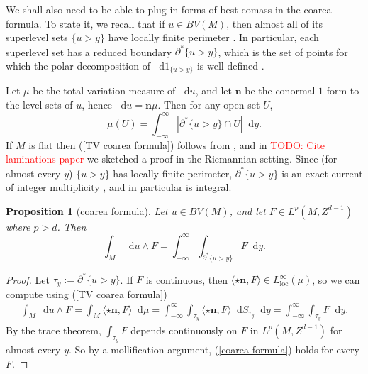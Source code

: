 \documentclass[reqno,11pt]{amsart}
\newcommand*\dif{\mathop{}\!\mathrm{d}}
\newcommand{\normal}{\mathbf n}
\newcommand{\loc}{\mathrm{loc}}
\newtheorem{proposition}[theorem]{Proposition}
\theoremstyle{definition}
\numberwithin{equation}{section}
\newcommand\todo[1]{\textcolor{red}{TODO: #1}}
\begin{document}
We shall also need to be able to plug in forms of best comass in the coarea formula.
To state it, we recall that if $u \in BV(M)$, then almost all of its superlevel sets $\{u > y\}$ have locally finite perimeter \cite[Theorem 1.23]{Giusti77}.
In particular, each superlevel set has a reduced boundary $\partial^* \{u > y\}$, which is the set of points for which the polar decomposition of $\dif 1_{\{u > y\}}$ is well-defined \cite[Chapter 3]{Giusti77}.

Let $\mu$ be the total variation measure of $\dif u$, and let $\normal$ be the conormal $1$-form to the level sets of $u$, hence $\dif u = \normal \mu$.
Then for any open set $U$,
\begin{equation}\label{TV coarea formula}
\mu(U) = \int_{-\infty}^\infty |\partial^* \{u > y\} \cap U| \dif y.
\end{equation}
If $M$ is flat then (\ref{TV coarea formula}) follows from \cite[Theorem 1.23]{Giusti77}, and in \todo{Cite laminations paper} we sketched a proof in the Riemannian setting.
Since (for almost every $y$) $\{u > y\}$ has locally finite perimeter, $\partial^* \{u > y\}$ is an exact current of integer multiplicity \cite[Theorem 14.3]{Simon84}, and in particular is integral.

\begin{proposition}[coarea formula]
Let $u \in BV(M)$, and let $F \in L^p(M, Z^{d - 1})$ where $p > d$. Then 
\begin{equation}\label{coarea formula}
\int_M \dif u \wedge F = \int_{-\infty}^\infty \int_{\partial^* \{u > y\}} F \dif y.
\end{equation}
\end{proposition}
\begin{proof}
Let $\tau_y := \partial^* \{u > y\}$.
If $F$ is continuous, then $\langle\star \normal, F\rangle \in L^\infty_\loc(\mu)$, so we can compute using (\ref{TV coarea formula})
\begin{align*}
\int_M \dif u \wedge F = \int_M \langle \star \normal, F\rangle \dif \mu = \int_{-\infty}^\infty \int_{\tau_y} \langle \star \normal, F\rangle \dif S_{\tau_y} \dif y = \int_{-\infty}^\infty \int_{\tau_y} F \dif y.
\end{align*}
By the trace theorem, $\int_{\tau_y} F$ depends continuously on $F$ in $L^p(M, Z^{d - 1})$ for almost every $y$.
So by a mollification argument, (\ref{coarea formula}) holds for every $F$.
\end{proof}



\end{document}
